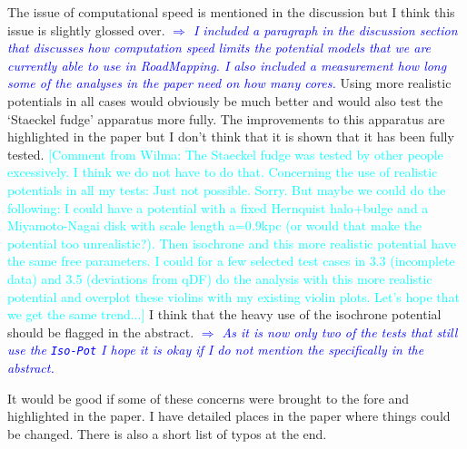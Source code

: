 \documentclass[10pt,a4paper]{article}
\newcommand{\HW}[1]{\textcolor{Cyan}{#1}}
\newcommand{\Comment}[1]{\textsl{\textcolor{Blue}{$\Longrightarrow$ {#1}}}}
\newcommand{\RM}{{\sl RoadMapping}}
\begin{document}
\begin{itemize}
The issue of computational speed is mentioned in the discussion but I think this issue is slightly glossed over. \Comment{I included a paragraph in the discussion section that discusses how computation speed limits the potential models that we are currently able to use in \RM{}. I also included a measurement how long some of the analyses in the paper need on how many cores.}
Using more realistic potentials in all cases would obviously be much better and would also test the `Staeckel fudge'
apparatus more fully. The improvements to this apparatus are highlighted in the paper but I don't think that it is shown that it has been fully tested.
\HW{[Comment from Wilma: The Staeckel fudge was tested by other people excessively. I think we do not have to do that. Concerning the use of realistic potentials in all my tests: Just not possible. Sorry. But maybe we could do the following: I could have a potential with a fixed Hernquist halo+bulge and a Miyamoto-Nagai disk with scale length a=0.9kpc (or would that make the potential too unrealistic?). Then isochrone and this more realistic potential have the same free parameters. I could for a few selected test cases in 3.3 (incomplete data) and 3.5 (deviations from qDF) do the analysis with this more realistic potential and overplot these violins with my existing violin plots. Let's hope that we get the same trend...]} I think that the heavy use of the isochrone potential should be flagged in the abstract. \Comment{As it is now only two of the tests that still use the \texttt{Iso-Pot} I hope it is okay if I do not mention the \text{Iso-Pot} specifically in the abstract.}
\end{itemize}

It would be good if some of these concerns were brought to the fore and highlighted
in the paper. I have detailed places in the paper where things could be changed.
There is also a short list of typos at the end.\\\\
\end{document}
